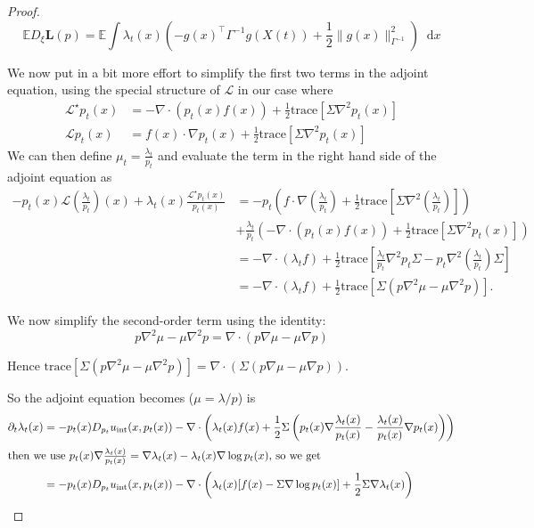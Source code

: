 \documentclass[10pt,a4paper]{amsart}
\newcommand{\E}{\mathbb E}
\newcommand{\cL}{\mathcal L}
\newcommand{\dd }{\mathop{}\!\mathrm{d}}
\newcommand{\tr}{\mathrm{trace}}
\begin{document}
\begin{proof}
\[\mathbb{E}D_\xi \mathbf L(p) = \E \int   \lambda_t(x)  \left( - g(x)^\top \Gamma^{-1} g(X(t))    +\frac{1}{2} \| g(x)\|^2_{\Gamma^{-1}} \right) \dd x\]


 We now put in a bit more effort to simplify the first two terms in the adjoint equation, using the special structure of $\cL$ in our case where 
\begin{align*}
    \cL^\star p_t(x) &= -\nabla \cdot (p_t(x) f(x)) + \frac{1}{2} \tr[\Sigma \nabla^2 p_t(x)] \\
    \cL p_t(x)  & = f(x) \cdot \nabla p_t(x) + \frac{1}{2}\tr[\Sigma \nabla^2 p_t(x)]
\end{align*}
We can then define $\mu_t = \frac{\lambda_t}{p_t}$ and evaluate the term in the right hand side of the adjoint equation as
\begin{align*}
    - p_t(x)\cL \left(\frac{\lambda_t}{p_t} \right)(x) + \lambda_t(x)\frac{\cL^\star p_t(x)}{p_t(x)} &= -p_t \left(  f \cdot \nabla \left(\frac{\lambda_t}{p_t} \right) + \frac{1}{2}\tr\left[\Sigma \nabla^2 \left( \frac{\lambda_t}{p_t} \right) \right] \right) \\
    &+  \frac{\lambda_t}{p_t} \left( -\nabla \cdot (p_t(x) f(x)) + \frac{1}{2} \tr[\Sigma \nabla^2 p_t(x)] \right)  \\
    & = -\nabla \cdot \left( \lambda_t f \right) + \frac{1}{2} \tr \left[ \frac{\lambda_t}{p_t} \nabla^2 p_t \Sigma - p_t \nabla^2 \left( \frac{\lambda_t}{p_t} \right) \Sigma  \right] \\
    &= -\nabla \cdot \left( \lambda_t f \right)  + \frac{1}{2} \tr\left[ \Sigma \left( p \nabla^2 \mu - \mu \nabla^2 p \right) \right].
\end{align*}


We now simplify the second-order term using the identity:
\[
p \nabla^2 \mu - \mu \nabla^2 p = \nabla \cdot (p \nabla \mu - \mu \nabla p)
\]

Hence $\tr\left[ \Sigma (p \nabla^2 \mu - \mu \nabla^2 p) \right]
= \nabla \cdot \left( \Sigma (p \nabla \mu - \mu \nabla p) \right) $. 

So the adjoint equation becomes ($\mu = \lambda /p$) is 
\begin{align*}
     \partial_t \lambda_t(x) &= -p_t(x) D_{p_t}u_\mathrm{int}(x,p_t(x)) -\nabla \cdot \left(\lambda_t(x) f(x) + \frac{1}{2} \Sigma \left(p_t(x) \nabla \frac{\lambda_t(x)}{p_t(x)} - \frac{\lambda_t(x)}{p_t(x)} \nabla p_t(x)\right) \right)\\
     \intertext{then we use $p_t(x) \nabla \frac{\lambda_t(x)}{p_t(x)} = \nabla \lambda_t(x) - \lambda_t(x) \nabla \log p_t(x)$, so we get}
     &= -p_t(x) D_{p_t}u_\mathrm{int}(x,p_t(x)) -\nabla \cdot \left(\lambda_t(x) [f(x) -\Sigma \nabla \log p_t(x)] + \frac{1}{2} \Sigma \nabla \lambda_t(x) \right)
\end{align*}
\end{proof}
\end{document}
